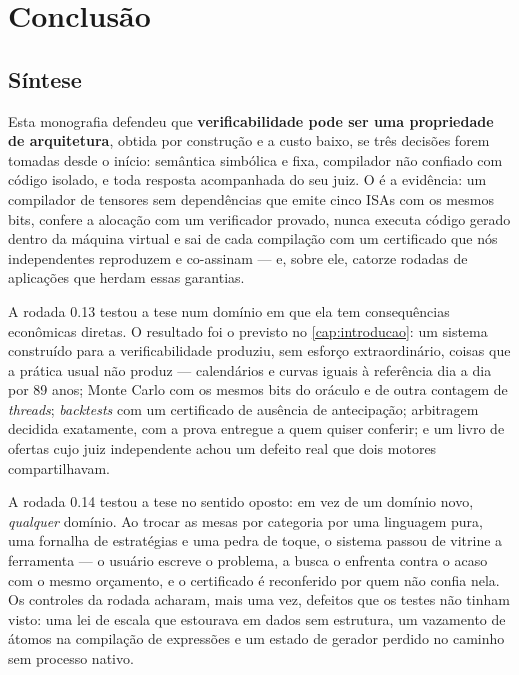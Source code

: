 \chapter{Conclusão}\label{cap:conclusao}

\section{Síntese}

Esta monografia defendeu que \textbf{verificabilidade pode ser uma propriedade de arquitetura}, obtida por construção e a custo baixo, se três decisões forem tomadas desde o início: semântica simbólica e fixa, compilador não confiado com código isolado, e toda resposta acompanhada do seu juiz. O \vapor{} é a evidência: um compilador de tensores sem dependências que emite cinco ISAs com os mesmos bits, confere a alocação com um verificador provado, nunca executa código gerado dentro da máquina virtual e sai de cada compilação com um certificado que nós independentes reproduzem e co-assinam --- e, sobre ele, catorze rodadas de aplicações que herdam essas garantias.

A rodada 0.13 testou a tese num domínio em que ela tem consequências econômicas diretas. O resultado foi o previsto no \autoref{cap:introducao}: um sistema construído para a verificabilidade produziu, sem esforço extraordinário, coisas que a prática usual não produz --- calendários e curvas iguais à referência dia a dia por 89 anos; Monte Carlo com os mesmos bits do oráculo e de outra contagem de \textit{threads}; \textit{backtests} com um certificado de ausência de antecipação; arbitragem decidida exatamente, com a prova entregue a quem quiser conferir; e um livro de ofertas cujo juiz independente achou um defeito real que dois motores compartilhavam.

A rodada 0.14 testou a tese no sentido oposto: em vez de um domínio novo, \emph{qualquer} domínio. Ao trocar as mesas por categoria por uma linguagem pura, uma fornalha de estratégias e uma pedra de toque, o sistema passou de vitrine a ferramenta --- o usuário escreve o problema, a busca o enfrenta contra o acaso com o mesmo orçamento, e o certificado é reconferido por quem não confia nela. Os controles da rodada acharam, mais uma vez, defeitos que os testes não tinham visto: uma lei de escala que estourava em dados sem estrutura, um vazamento de átomos na compilação de expressões e um estado de gerador perdido no caminho sem processo nativo.

